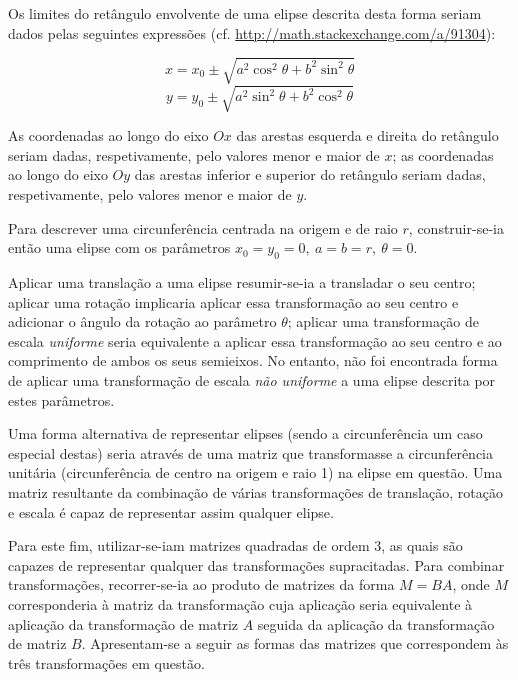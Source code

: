 \documentclass[a4paper]{article}
\begin{document}
Os limites do retângulo envolvente de uma elipse descrita desta forma seriam dados pelas seguintes expressões (cf. \url{http://math.stackexchange.com/a/91304}):

\[ x = x_0 \pm \sqrt{a^2 \cos^2 \theta + b^2 \sin^2 \theta} \]
\[ y = y_0 \pm \sqrt{a^2 \sin^2 \theta + b^2 \cos^2 \theta} \]

As coordenadas ao longo do eixo \(Ox\) das arestas esquerda e direita do retângulo seriam dadas, respetivamente, pelo valores menor e maior de \(x\); as coordenadas ao longo do eixo \(Oy\) das arestas inferior e superior do retângulo seriam dadas, respetivamente, pelo valores menor e maior de \(y\).

Para descrever uma circunferência centrada na origem e de raio \(r\), construir-se-ia então uma elipse com os parâmetros \(x_0 = y_0 = 0,\ a = b = r,\ \theta = 0\).

Aplicar uma translação a uma elipse resumir-se-ia a transladar o seu centro; aplicar uma rotação implicaria aplicar essa transformação ao seu centro e adicionar o ângulo da rotação ao parâmetro \(\theta\); aplicar uma transformação de escala \emph{uniforme} seria equivalente a aplicar essa transformação ao seu centro e ao comprimento de ambos os seus semieixos. No entanto, não foi encontrada forma de aplicar uma transformação de escala \emph{não uniforme} a uma elipse descrita por estes parâmetros.

\bigskip

Uma forma alternativa de representar elipses (sendo a circunferência um caso especial destas) seria através de uma matriz que transformasse a circunferência unitária (circunferência de centro na origem e raio 1) na elipse em questão. Uma matriz resultante da combinação de várias transformações de translação, rotação e escala é capaz de representar assim qualquer elipse.

Para este fim, utilizar-se-iam matrizes quadradas de ordem 3, as quais são capazes de representar qualquer das transformações supracitadas. Para combinar transformações, recorrer-se-ia ao produto de matrizes da forma \(M = BA\), onde \(M\) corresponderia à matriz da transformação cuja aplicação seria equivalente à aplicação da transformação de matriz \(A\) seguida da aplicação da transformação de matriz \(B\). Apresentam-se a seguir as formas das matrizes que correspondem às três transformações em questão.
\end{document}
